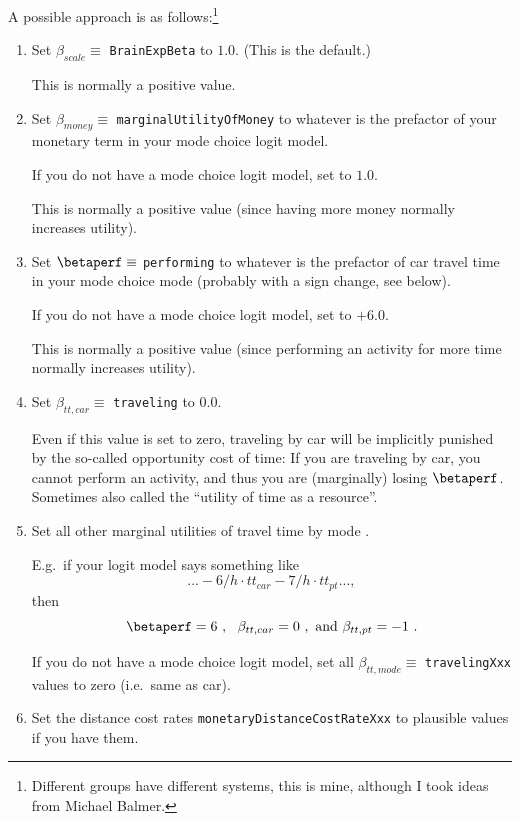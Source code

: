 A possible approach is as follows:\footnote{%
%
Different groups have different systems, this is mine, although I took ideas from Michael Balmer.
%
}
\begin{enumerate}

\item Set $\beta_{scale} \equiv$ \verb$BrainExpBeta$ to $1.0$.  (This is the default.)

This is normally a positive value.

\item Set $\beta_{money} \equiv$ \verb$marginalUtilityOfMoney$ to whatever is the prefactor of your monetary term in your mode choice logit model.

If you do not have a mode choice logit model, set to $1.0$. 

This is normally a positive value (since having more money normally increases utility).

\item Set $\betaperf \equiv$ \verb$performing$ to whatever is the prefactor of car travel time in your mode choice mode (probably with a sign change, see below).

If you do not have a mode choice logit model, set to $+6.0$.

This is normally a positive value (since performing an activity for more time normally increases utility).

\item Set $\beta_{tt,car} \equiv$ \verb$traveling$ to $0.0$.

  Even if this value is set to zero, traveling by car will be implicitly punished by the so-called opportunity cost of time: If you are traveling by car, you cannot perform an activity, and thus you are (marginally) losing $\betaperf$.  Sometimes also called the ``utility of time as a resource''.

\item Set all other marginal utilities of travel time by mode .

E.g.\ if your logit model says something like 
\[
... -6/h \cdot tt_{car} - 7/h \cdot tt_{pt} ... ,
\]
then 
\[
\betaperf = 6 \ , \ \ \beta_{tt,car} = 0 \ , \hbox{ and } \beta_{tt,pt} = -1 \ .
\]

If you do not have a mode choice logit model, set all $\beta_{tt,mode} \equiv$ \verb$travelingXxx$ values to zero (i.e.\ same as car).

\item Set the distance cost rates \verb$monetaryDistanceCostRateXxx$ to plausible values if you have them.


\end{enumerate}
